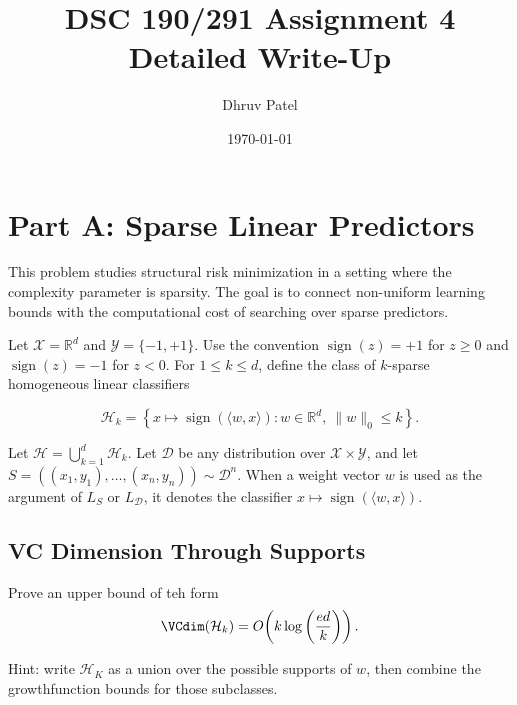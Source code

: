\documentclass[11pt]{article}
\title{\textbf{DSC 190/291 Assignment 4}\\Detailed Write-Up}
\author{Dhruv Patel}
\date{\today}
\newcommand{\calH}{\mathcal{H}}
\begin{document}
\maketitle
\tableofcontents
\newpage

\section{Part A: Sparse Linear Predictors}
This problem studies structural risk minimization in a setting where the complexity parameter 
is sparsity. The goal is to connect non-uniform learning bounds with the computational cost of 
searching over sparse predictors.

Let $\mathcal{X} = \mathbb{R}^d$ and $\mathcal{Y} = \{-1,+1\}$. Use the convention 
$\operatorname{sign}(z) = +1$ for $z \ge 0$ and $\operatorname{sign}(z) = -1$ for $z < 0$. 
For $1 \le k \le d$, define the class of $k$-sparse homogeneous linear classifiers


\[
\mathcal{H}_k = \left\{ x \mapsto \operatorname{sign}(\langle w, x \rangle) : 
w \in \mathbb{R}^d,\ \|w\|_0 \le k \right\}.
\]


Let $\mathcal{H} = \bigcup_{k=1}^d \mathcal{H}_k$. Let $\mathcal{D}$ be any distribution over 
$\mathcal{X} \times \mathcal{Y}$, and let $S = ((x_1,y_1),\dots,(x_n,y_n)) \sim \mathcal{D}^n$. 
When a weight vector $w$ is used as the argument of $L_S$ or $L_{\mathcal{D}}$, it denotes the classifier 
$x \mapsto \operatorname{sign}(\langle w, x \rangle)$.
\subsection{VC Dimension Through Supports}
Prove an upper bound of teh form
\[
\VCdim(\calH_k) = O\!\left(k \log\left(\frac{ed}{k}\right)\right).
\]

Hint: write $\calH_K$ as a union over the possible supports of $w$, then combine the growthfunction bounds for those subclasses.
\end{document}
